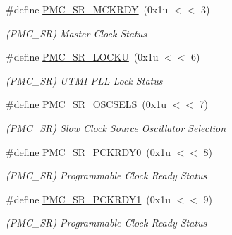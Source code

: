 \begin{DoxyCompactItemize}
\#define \mbox{\hyperlink{group__SAME70__PMC_gae742c07d37e3011571a705ca768a5fee}{P\+M\+C\+\_\+\+S\+R\+\_\+\+M\+C\+K\+R\+DY}}~(0x1u $<$$<$ 3)
\begin{DoxyCompactList}\small\item\em (P\+M\+C\+\_\+\+SR) Master Clock Status \end{DoxyCompactList}\item 
\mbox{\label{group__SAME70__PMC_gad6d4d9511d87b4e9375d3773c2bf6715}} 
\#define \mbox{\hyperlink{group__SAME70__PMC_gad6d4d9511d87b4e9375d3773c2bf6715}{P\+M\+C\+\_\+\+S\+R\+\_\+\+L\+O\+C\+KU}}~(0x1u $<$$<$ 6)
\begin{DoxyCompactList}\small\item\em (P\+M\+C\+\_\+\+SR) U\+T\+MI P\+LL Lock Status \end{DoxyCompactList}\item 
\mbox{\label{group__SAME70__PMC_ga3457d80fc8da68f5e954ab338f49fa22}} 
\#define \mbox{\hyperlink{group__SAME70__PMC_ga3457d80fc8da68f5e954ab338f49fa22}{P\+M\+C\+\_\+\+S\+R\+\_\+\+O\+S\+C\+S\+E\+LS}}~(0x1u $<$$<$ 7)
\begin{DoxyCompactList}\small\item\em (P\+M\+C\+\_\+\+SR) Slow Clock Source Oscillator Selection \end{DoxyCompactList}\item 
\mbox{\label{group__SAME70__PMC_ga93e796516593a50d41d0aed02d2f0a27}} 
\#define \mbox{\hyperlink{group__SAME70__PMC_ga93e796516593a50d41d0aed02d2f0a27}{P\+M\+C\+\_\+\+S\+R\+\_\+\+P\+C\+K\+R\+D\+Y0}}~(0x1u $<$$<$ 8)
\begin{DoxyCompactList}\small\item\em (P\+M\+C\+\_\+\+SR) Programmable Clock Ready Status \end{DoxyCompactList}\item 
\mbox{\label{group__SAME70__PMC_ga02a40065bfafdb6c76cb8618e00091c1}} 
\#define \mbox{\hyperlink{group__SAME70__PMC_ga02a40065bfafdb6c76cb8618e00091c1}{P\+M\+C\+\_\+\+S\+R\+\_\+\+P\+C\+K\+R\+D\+Y1}}~(0x1u $<$$<$ 9)
\begin{DoxyCompactList}\small\item\em (P\+M\+C\+\_\+\+SR) Programmable Clock Ready Status \end{DoxyCompactList}\item 
$$
\end{DoxyCompactItemize}
